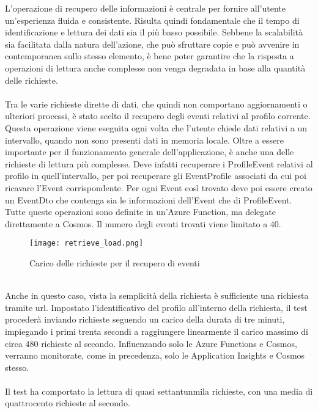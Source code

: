 L'operazione di recupero delle informazioni è centrale 
per fornire all'utente un'esperienza fluida e consistente.
Risulta quindi fondamentale che il tempo di identificazione e lettura dei dati sia il più basso possibile.
Sebbene la scalabilità sia facilitata dalla natura dell'azione,
che può sfruttare copie e può avvenire in contemporanea sullo stesso elemento,
è bene poter garantire che la risposta a operazioni di lettura anche complesse 
non venga degradata in base alla quantità delle richieste.\\
\\
Tra le varie richieste dirette di dati, 
che quindi non comportano aggiornamenti o ulteriori processi,
è stato scelto il recupero degli eventi relativi al profilo corrente.
Questa operazione viene eseguita ogni volta che l'utente chiede dati relativi a un intervallo, 
quando non sono presenti dati in memoria locale.
Oltre a essere importante per il funzionamento generale dell'applicazione,
è anche una delle richieste di lettura più complesse.
Deve infatti recuperare i ProfileEvent relativi al profilo in quell'intervallo,
per poi recuperare gli EventProfile associati da cui poi ricavare l'Event corrispondente.
Per ogni Event così trovato deve poi essere creato un EventDto che contenga 
sia le informazioni dell'Event che di ProfileEvent.
Tutte queste operazioni sono definite in un'Azure Function, 
ma delegate direttamente a Cosmos.
Il numero degli eventi trovati viene limitato a 40.\\
\begin{figure}[htbp]
    \begin{center}
        \texttt{[image: retrieve\_load.png]}
        \caption{Carico delle richieste per il recupero di eventi}
    \end{center}
\end{figure}
\\
Anche in questo caso, 
vista la semplicità della richiesta è sufficiente una richiesta tramite url.
Impostato l'identificativo del profilo all'interno della richiesta, 
il test procederà inviando richieste seguendo un carico della durata di tre minuti, 
impiegando i primi trenta secondi a raggiungere linearmente il carico massimo di circa 480 richieste al secondo.
Influenzando solo le Azure Functions e Cosmos, verranno monitorate, come in precedenza, 
solo le Application Insights e Cosmos stesso.\\
\\
Il test ha comportato la lettura di quasi settantunmila richieste,
con una media di quattrocento richieste al secondo.

